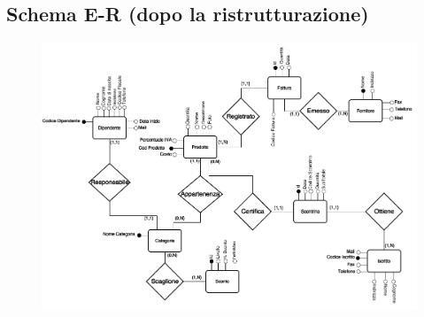 \begin{landscape}

  \thispagestyle{empty}

  \subsection{Schema E-R (dopo la ristrutturazione)}

  \begin{figure}[h!]
    \centering
    \includegraphics[scale=0.6]{include/progettazioneConcettuale/schemaER/PostRistrutturaz}
  \end{figure}
  
\end{landscape}

\restoregeometry
